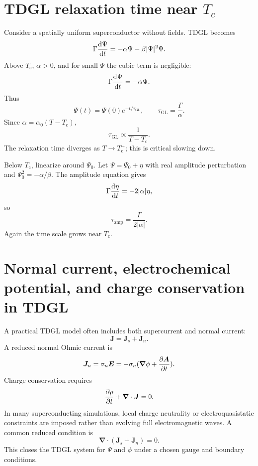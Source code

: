 \documentclass[11pt]{article}
\numberwithin{equation}{section}
\newcommand{\Avec}{\bm{A}}
\newcommand{\Evec}{\bm{E}}
\newcommand{\Jvec}{\bm{J}}
\renewcommand{\grad}{\bm{\nabla}}
\newcommand{\Tc}{T_{\mathrm{c}}}
\newcommand{\Ord}{\Psi}
\newcommand{\GammaTD}{\Gamma}
\begin{document}
\section{TDGL relaxation time near $T_c$}

Consider a spatially uniform superconductor without fields. TDGL becomes
\begin{equation}
\GammaTD\dv{\Ord}{t}=-\alpha\Ord-\beta|\Ord|^2\Ord.
\end{equation}
Above $\Tc$, $\alpha>0$, and for small $\Ord$ the cubic term is negligible:
\begin{equation}
\GammaTD\dv{\Ord}{t}=-\alpha\Ord.
\end{equation}
Thus
\begin{equation}
\Ord(t)=\Ord(0)e^{-t/\tau_{\mathrm{GL}}},
\qquad
\boxed{\tau_{\mathrm{GL}}=\frac{\GammaTD}{\alpha}.}
\end{equation}
Since $\alpha=\alpha_0(T-\Tc)$,
\begin{equation}
\tau_{\mathrm{GL}}\propto \frac{1}{T-\Tc}.
\end{equation}
The relaxation time diverges as $T\to\Tc^+$; this is critical slowing down.

Below $\Tc$, linearize around $\Ord_0$. Let $\Ord=\Ord_0+\eta$ with real amplitude perturbation and $\Ord_0^2=-\alpha/\beta$. The amplitude equation gives
\begin{equation}
\GammaTD\dv{\eta}{t}=-2|\alpha|\eta,
\end{equation}
so
\begin{equation}
\tau_{\mathrm{amp}}=\frac{\GammaTD}{2|\alpha|}.
\end{equation}
Again the time scale grows near $\Tc$.

\section{Normal current, electrochemical potential, and charge conservation in TDGL}

A practical TDGL model often includes both supercurrent and normal current:
\begin{equation}
\Jvec=\Jvec_s+\Jvec_n.
\end{equation}
A reduced normal Ohmic current is
\begin{equation}
\Jvec_n=\sigma_n\Evec=-\sigma_n(\grad\phi+\pdv{\Avec}{t}).
\end{equation}
Charge conservation requires
\begin{equation}
\pdv{\rho}{t}+\grad\cdot\Jvec=0.
\end{equation}
In many superconducting simulations, local charge neutrality or electroquasistatic constraints are imposed rather than evolving full electromagnetic waves. A common reduced condition is
\begin{equation}
\grad\cdot(\Jvec_s+\Jvec_n)=0.
\end{equation}
This closes the TDGL system for $\Ord$ and $\phi$ under a chosen gauge and boundary conditions.
\end{document}
